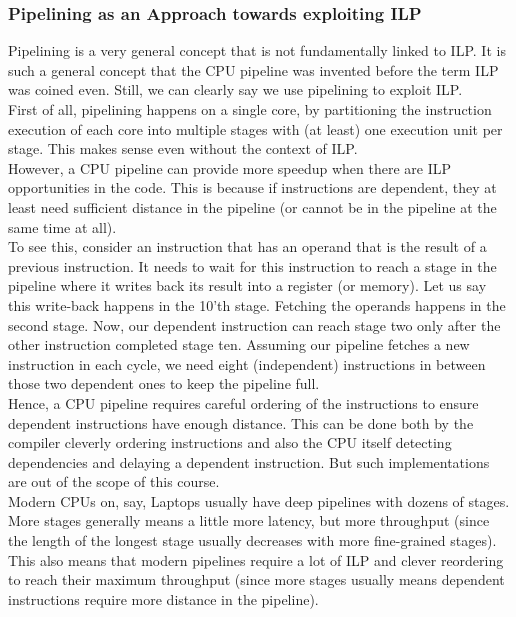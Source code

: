 \documentclass[main.tex]{subfiles}
\begin{document}
\subsubsection{Pipelining as an Approach towards exploiting ILP}
Pipelining is a very general concept that is not fundamentally linked to ILP. It is such a general concept that the CPU pipeline was invented before the term ILP was coined even. Still, we can clearly say we use pipelining to exploit ILP.\\
First of all, pipelining happens on a single core, by partitioning the instruction execution of each core into multiple stages with (at least) one execution unit per stage. This makes sense even without the context of ILP.\\[3mm]
However, a CPU pipeline can provide more speedup when there are ILP opportunities in the code. This is because if instructions are dependent, they at least need sufficient distance in the pipeline (or cannot be in the pipeline at the same time at all).\\
To see this, consider an instruction that has an operand that is the result of a previous instruction. It needs to wait for this instruction to reach a stage in the pipeline where it writes back its result into a register (or memory). Let us say this write-back happens in the 10'th stage. Fetching the operands happens in the second stage. Now, our dependent instruction can reach stage two only after the other instruction completed stage ten. Assuming our pipeline fetches a new instruction in each cycle, we need eight (independent) instructions in between those two dependent ones to keep the pipeline full.\\
Hence, a CPU pipeline requires careful ordering of the instructions to ensure dependent instructions have enough distance. This can be done both by the compiler cleverly ordering instructions and also the CPU itself detecting dependencies and delaying a dependent instruction. But such implementations are out of the scope of this course.\\[3mm]
Modern CPUs on, say, Laptops usually have deep pipelines with dozens of stages. More stages generally means a little more latency, but more throughput (since the length of the longest stage usually decreases with more fine-grained stages). This also means that modern pipelines require a lot of ILP and clever reordering to reach their maximum throughput (since more stages usually means dependent instructions require more distance in the pipeline).
\end{document}
